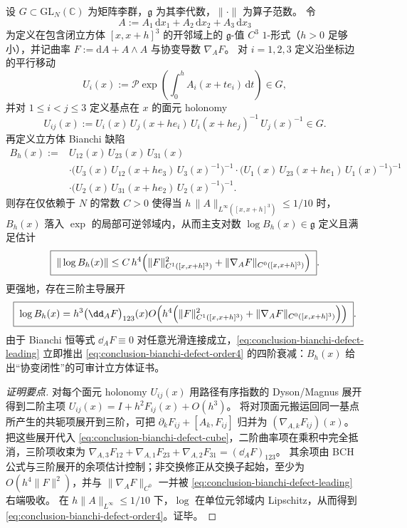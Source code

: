 \begin{theorem}\label{thm:conclusion-nonabelian-stokes-bianchi-cube-certificate}
设 \(G\subset \mathrm{GL}_N(\mathbb C)\) 为矩阵李群，\(\mathfrak g\) 为其李代数，\(\|\cdot\|\) 为算子范数。
令
\[
A:=A_1\,\mathrm d x_1+A_2\,\mathrm d x_2+A_3\,\mathrm d x_3
\]
为定义在包含闭立方体 \([x,x+h]^3\) 的开邻域上的 \(\mathfrak g\)-值 \(C^3\) \(1\)-形式（\(h>0\) 足够小），并记曲率 \(F:=\mathrm d A+A\wedge A\) 与协变导数 \(\nabla_A F\)。
对 \(i=1,2,3\) 定义沿坐标边的平行移动
\[
U_i(x):=\mathcal P\exp\!\left(\int_0^h A_i(x+t e_i)\,\mathrm d t\right)\in G,
\]
并对 \(1\le i<j\le 3\) 定义基点在 \(x\) 的面元 holonomy
\[
U_{ij}(x):=U_i(x)\,U_j(x+h e_i)\,U_i(x+h e_j)^{-1}\,U_j(x)^{-1}\in G.
\]
再定义立方体 Bianchi 缺陷
\begin{equation}\label{eq:conclusion-bianchi-defect-cube}
\begin{aligned}
B_h(x):={}&U_{12}(x)\,U_{23}(x)\,U_{31}(x)\\
&\cdot\bigl(U_3(x)\,U_{12}(x+h e_3)\,U_3(x)^{-1}\bigr)^{-1}
\cdot\bigl(U_1(x)\,U_{23}(x+h e_1)\,U_1(x)^{-1}\bigr)^{-1}\\
&\cdot\bigl(U_2(x)\,U_{31}(x+h e_2)\,U_2(x)^{-1}\bigr)^{-1}.
\end{aligned}
\end{equation}
则存在仅依赖于 \(N\) 的常数 \(C>0\) 使得当 \(h\,\|A\|_{L^\infty([x,x+h]^3)}\le 1/10\) 时，\(B_h(x)\) 落入 \(\exp\) 的局部可逆邻域内，从而主支对数 \(\log B_h(x)\in\mathfrak g\) 定义且满足估计
\begin{equation}\label{eq:conclusion-bianchi-defect-order4}
\boxed{\;
\|\log B_h(x)\|
\le
C\,h^4\Bigl(\|F\|_{C^1([x,x+h]^3)}^{2}+\|\nabla_A F\|_{C^0([x,x+h]^3)}\Bigr)\; }.
\end{equation}
更强地，存在三阶主导展开
\begin{equation}\label{eq:conclusion-bianchi-defect-leading}
\boxed{\;
\log B_h(x)
=h^3\bigl(\dd_A F\bigr)_{123}(x)
O\!\left(h^4\Bigl(\|F\|_{C^1([x,x+h]^3)}^{2}+\|\nabla_A F\|_{C^0([x,x+h]^3)}\Bigr)\right)\; }.
\end{equation}
由于 Bianchi 恒等式 \(\dd_A F\equiv 0\) 对任意光滑连接成立，\eqref{eq:conclusion-bianchi-defect-leading} 立即推出 \eqref{eq:conclusion-bianchi-defect-order4} 的四阶衰减：\(B_h(x)\) 给出“协变闭性”的可审计立方体证书。
\end{theorem}
\begin{proof}[证明要点]
对每个面元 holonomy \(U_{ij}(x)\) 用路径有序指数的 Dyson/Magnus 展开得到二阶主项
\(
U_{ij}(x)=I+h^2F_{ij}(x)+O(h^3)
\)。
将对顶面元搬运回同一基点所产生的共轭项展开到三阶，可把 \(\partial_kF_{ij}+[A_k,F_{ij}]\) 归并为 \((\nabla_{A,k}F_{ij})(x)\)。
把这些展开代入 \eqref{eq:conclusion-bianchi-defect-cube}，二阶曲率项在乘积中完全抵消，三阶项收束为
\(
\nabla_{A,3}F_{12}+\nabla_{A,1}F_{23}+\nabla_{A,2}F_{31}
=(\dd_A F)_{123}
\)。
其余项由 BCH 公式与三阶展开的余项估计控制；非交换修正从交换子起始，至少为 \(O(h^4\|F\|^2)\)，并与 \(\|\nabla_A F\|_{C^0}\) 一并被 \eqref{eq:conclusion-bianchi-defect-leading} 右端吸收。
在 \(h\|A\|_{L^\infty}\le 1/10\) 下，\(\log\) 在单位元邻域内 Lipschitz，从而得到 \eqref{eq:conclusion-bianchi-defect-order4}。证毕。
\end{proof}

